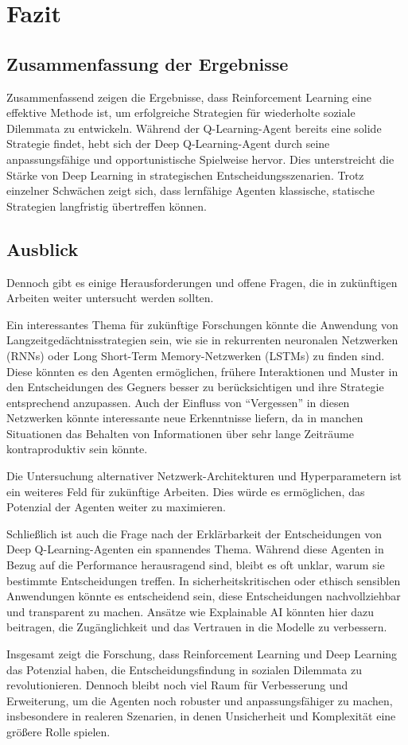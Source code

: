 \chapter{Fazit}
\section{Zusammenfassung der Ergebnisse}
Zusammenfassend zeigen die Ergebnisse, dass Reinforcement Learning eine effektive Methode ist, um erfolgreiche Strategien für wiederholte 
soziale Dilemmata zu entwickeln. Während der Q-Learning-Agent bereits eine solide Strategie findet, hebt sich der Deep Q-Learning-Agent 
durch seine anpassungsfähige und opportunistische Spielweise hervor. Dies unterstreicht die Stärke von Deep Learning in strategischen 
Entscheidungsszenarien. Trotz einzelner Schwächen zeigt sich, dass lernfähige Agenten klassische, statische Strategien langfristig übertreffen können.

\section{Ausblick}
Dennoch gibt es einige Herausforderungen und 
offene Fragen, die in zukünftigen Arbeiten weiter untersucht werden sollten.

Ein interessantes Thema für zukünftige Forschungen könnte die Anwendung von Langzeitgedächtnisstrategien sein, 
wie sie in rekurrenten neuronalen Netzwerken (RNNs) oder Long Short-Term Memory-Netzwerken (LSTMs) zu finden sind. 
Diese könnten es den Agenten ermöglichen, frühere Interaktionen und Muster in den Entscheidungen des Gegners besser zu berücksichtigen 
und ihre Strategie entsprechend anzupassen. Auch der Einfluss von ``Vergessen'' in diesen Netzwerken könnte interessante neue 
Erkenntnisse liefern, da in manchen Situationen das Behalten von Informationen über sehr lange Zeiträume kontraproduktiv sein könnte.

Die Untersuchung alternativer Netzwerk-Architekturen und Hyperparametern ist ein weiteres Feld für zukünftige Arbeiten. 
Dies würde es ermöglichen, das Potenzial der Agenten weiter zu maximieren.

Schließlich ist auch die Frage nach der Erklärbarkeit der Entscheidungen von Deep Q-Learning-Agenten ein spannendes Thema. 
Während diese Agenten in Bezug auf die Performance herausragend sind, bleibt es oft unklar, warum sie bestimmte Entscheidungen treffen. 
In sicherheitskritischen oder ethisch sensiblen Anwendungen könnte es entscheidend sein, diese Entscheidungen nachvollziehbar 
und transparent zu machen. Ansätze wie Explainable AI könnten hier dazu beitragen, die Zugänglichkeit und das 
Vertrauen in die Modelle zu verbessern.

Insgesamt zeigt die Forschung, dass Reinforcement Learning und Deep Learning das Potenzial haben, die Entscheidungsfindung in sozialen Dilemmata zu revolutionieren. Dennoch bleibt noch viel Raum für Verbesserung und Erweiterung, um die Agenten noch robuster und anpassungsfähiger zu machen, insbesondere in realeren Szenarien, in denen Unsicherheit und Komplexität eine größere Rolle spielen.

